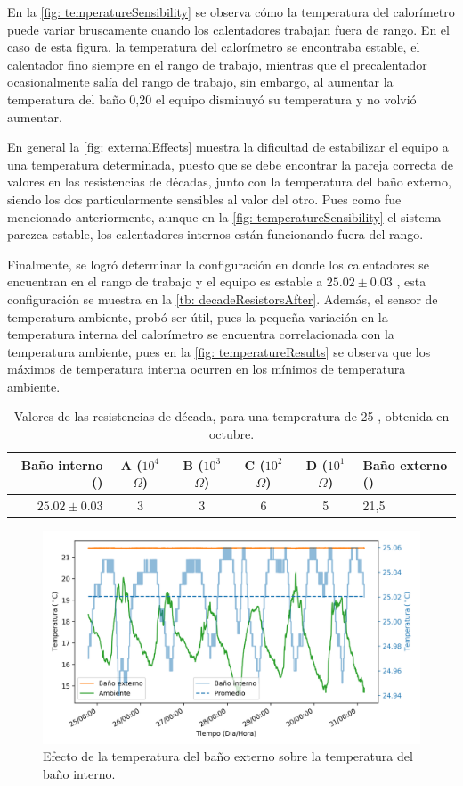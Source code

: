 	En la \autoref{fig: temperatureSensibility} se observa cómo la temperatura del calorímetro puede variar bruscamente cuando los calentadores trabajan fuera de rango. En el caso de esta figura, la temperatura del calorímetro se encontraba estable, el calentador fino siempre en el rango de trabajo, mientras que el precalentador ocasionalmente salía del rango de trabajo, sin embargo, al aumentar la temperatura del baño 0,20 \grad{} el equipo disminuyó su temperatura y no volvió aumentar. 
	
	En general la \autoref{fig: externalEffects} muestra la dificultad de estabilizar el equipo a una temperatura determinada, puesto que se debe encontrar la pareja correcta de valores en las resistencias de décadas, junto con la temperatura del baño externo, siendo los dos particularmente sensibles al valor del otro. Pues como fue mencionado anteriormente, aunque en la \autoref{fig: temperatureSensibility} el sistema parezca estable, los calentadores internos están funcionando fuera del rango.
	
	Finalmente, se logró determinar la configuración en donde los calentadores se encuentran en el rango de trabajo y el equipo es estable a $25.02 \pm 0.03$ \grad{}, esta configuración se muestra en la \autoref{tb: decadeResistorsAfter}. Además, el sensor de temperatura ambiente, probó ser útil, pues la pequeña variación en la temperatura interna del calorímetro se encuentra correlacionada con la temperatura ambiente, pues en la \autoref{fig: temperatureResults} se observa que los máximos de temperatura interna ocurren en los mínimos de temperatura ambiente.
	\begin{table}[h]
		\centering
		\caption{Valores de las resistencias de década, para una temperatura de 25 \grad{}, obtenida en octubre.}
		\begin{tabular}{r|cccc|l}
			\hline
			\textbf{Baño interno (\grad{})} & A ($10^4$ $\Omega$) & B ($10^3$ $\Omega$) & C ($10^2$ $\Omega$) & D ($10^1$ $\Omega$) & \textbf{Baño externo (\grad{})} \\
			\hline
			$25.02 \pm 0.03$ & 3 & 3 & 6 & 5 & 21,5 \\
			\hline
		\end{tabular}
		\label{tb: decadeResistorsAfter}
	\end{table}

	\begin{figure}[h]
		\centering
		\includegraphics[width=\linewidth]{../Data/TemperatureStability/temperatureStability}
		\caption{Efecto de la temperatura del baño externo sobre la temperatura del baño interno.}
		\label{fig: temperatureResults}
	\end{figure}